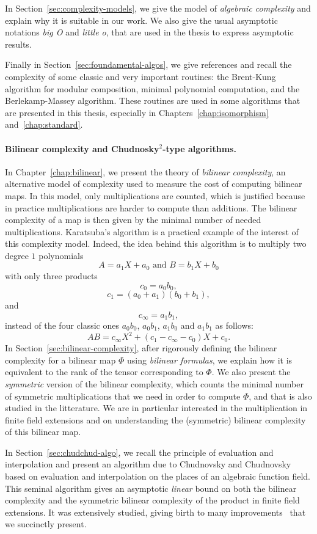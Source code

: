 In Section~\ref{sec:complexity-models}, we give the model of \emph{algebraic
complexity} and explain why it is suitable in our work. We also give the usual
asymptotic notations \emph{big O} and \emph{little o}, that are used in the
thesis to express asymptotic results.

Finally in Section~\ref{sec:foundamental-algos}, we give references and recall
the complexity of some classic and very important routines: the Brent-Kung
algorithm for modular composition, minimal polynomial computation, and the
Berlekamp-Massey algorithm. These routines are used in some
algorithms that are presented in this thesis, especially
in Chapters~\ref{chap:isomorphism} and~\ref{chap:standard}.

\paragraph{Bilinear complexity and Chudnosky$^2$-type algorithms.} In
Chapter~\ref{chap:bilinear}, we present the theory of \emph{bilinear
complexity}, an alternative model of complexity used to measure the cost of
computing bilinear maps. In this model, only multiplications are counted, which
is justified because in practice multiplications are harder to compute than
additions. The bilinear complexity of a map is then given by the minimal number
of needed multiplications. Karatsuba's algorithm is a practical example of the
interest of this complexity model. Indeed, the idea behind this algorithm is to
multiply two degree $1$ polynomials
\[
  A = a_1 X + a_0\text{ and }B = b_1 X + b_0
\]
with only three products
\[
  c_0 = a_0b_0,
\]
\[
  c_1 = (a_0+a_1)(b_0+b_1),
\]
and
\[
  c_\infty = a_1b_1,
\]
instead
of the four classic ones $a_0b_0$, $a_0b_1$, $a_1b_0$ and $a_1b_1$ as follows:
\[
  AB = c_\infty X^2 + (c_1-c_\infty-c_0) X + c_0.
\]
In Section~\ref{sec:bilinear-complexity}, after rigorously defining the bilinear
complexity for a bilinear map $\Phi$ using \emph{bilinear formulas}, we explain
how it is equivalent to the rank of the tensor corresponding to $\Phi$. We also
present the \emph{symmetric} version of the bilinear complexity, which counts
the minimal number of symmetric multiplications that we need in order to compute
$\Phi$, and that is also studied in the litterature. We are in particular
interested in the multiplication in finite field extensions and on understanding
the (symmetric) bilinear complexity of this bilinear map.

In Section~\ref{sec:chudchud-algo}, we recall the principle of evaluation and
interpolation and present an algorithm due to Chudnovsky and
Chudnovsky~\cite{CC88} based on evaluation and interpolation on the places of an
algebraic function field. This seminal algorithm gives an asymptotic
\emph{linear} bound on
both the bilinear complexity and the symmetric bilinear complexity of the
product in finite field extensions. It was extensively studied, giving birth to
many improvements~\cite{BR04, CO10, Randriam12} that we succinctly present.

